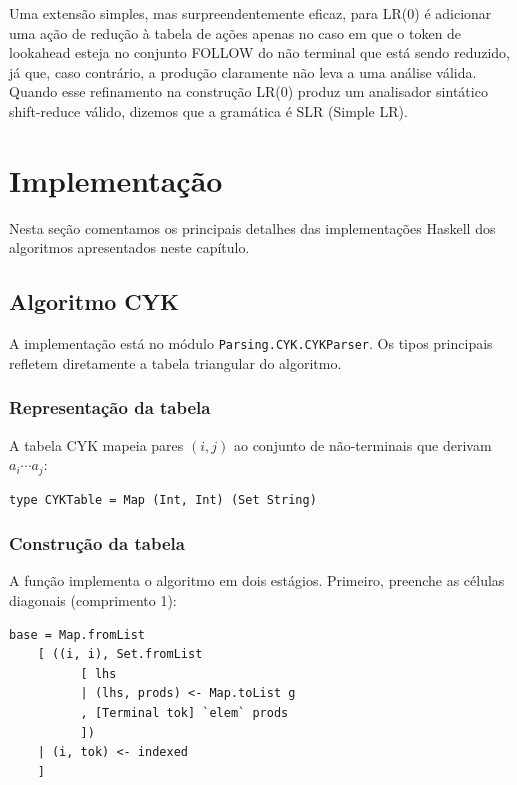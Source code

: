 Uma extensão simples, mas surpreendentemente eficaz, para LR(0) é
adicionar uma ação de redução à tabela de ações apenas no caso em que
o token de lookahead esteja no conjunto FOLLOW do não terminal que
está sendo reduzido, já que, caso contrário, a produção claramente
não leva a uma análise válida. Quando esse refinamento na construção
LR(0) produz um analisador sintático shift-reduce válido, dizemos que
a gramática é SLR (Simple LR).

\section{Implementação}

Nesta seção comentamos os principais detalhes das implementações
Haskell dos algoritmos apresentados neste capítulo.

\subsection{Algoritmo CYK}

A implementação está no módulo \verb|Parsing.CYK.CYKParser|.
Os tipos principais refletem diretamente a tabela triangular do algoritmo.

\subsubsection{Representação da tabela}

A tabela CYK mapeia pares $(i, j)$ ao conjunto de não-terminais que derivam $a_i \cdots a_j$:

\begin{verbatim}
type CYKTable = Map (Int, Int) (Set String)
\end{verbatim}

\subsubsection{Construção da tabela}

A função  implementa o algoritmo em dois estágios. Primeiro, preenche as células diagonais (comprimento 1):

\begin{verbatim}
base = Map.fromList
    [ ((i, i), Set.fromList
          [ lhs
          | (lhs, prods) <- Map.toList g
          , [Terminal tok] `elem` prods
          ])
    | (i, tok) <- indexed
    ]
\end{verbatim}

